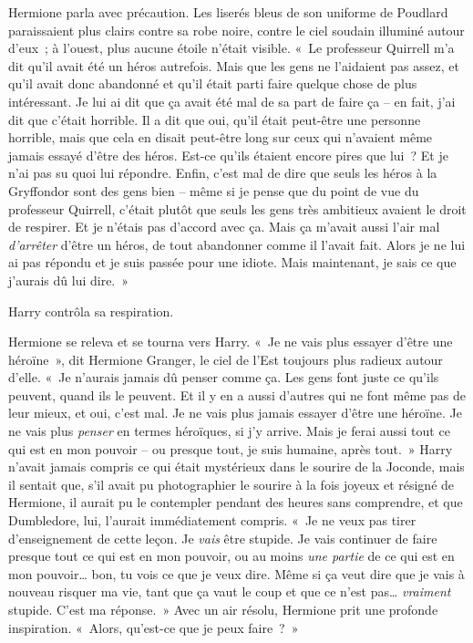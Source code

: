 Hermione parla avec précaution. Les liserés bleus de son uniforme de Poudlard paraissaient plus clairs contre sa robe noire, contre le ciel soudain illuminé autour d'eux~; à l'ouest, plus aucune étoile n'était visible. «~Le professeur Quirrell m'a dit qu'il avait été un héros autrefois. Mais que les gens ne l'aidaient pas assez, et qu'il avait donc abandonné et qu'il était parti faire quelque chose de plus intéressant. Je lui ai dit que ça avait été mal de sa part de faire ça -- en fait, j'ai dit que c'était horrible. Il a dit que oui, qu'il était peut-être une personne horrible, mais que cela en disait peut-être long sur ceux qui n'avaient même jamais essayé d'être des héros. Est-ce qu'ils étaient encore pires que lui~? Et je n'ai pas su quoi lui répondre. Enfin, c'est mal de dire que seuls les héros à la Gryffondor sont des gens bien -- même si je pense que du point de vue du professeur Quirrell, c'était plutôt que seuls les gens très ambitieux avaient le droit de respirer. Et je n'étais pas d'accord avec ça. Mais ça m'avait aussi l'air mal \emph{d'arrêter} d'être un héros, de tout abandonner comme il l'avait fait. Alors je ne lui ai pas répondu et je suis passée pour une idiote. Mais maintenant, je sais ce que j'aurais dû lui dire.~»

Harry contrôla sa respiration.

Hermione se releva et se tourna vers Harry. «~Je ne vais plus essayer d'être une héroïne~», dit Hermione Granger, le ciel de l'Est toujours plus radieux autour d'elle. «~Je n'aurais jamais dû penser comme ça. Les gens font juste ce qu'ils peuvent, quand ils le peuvent. Et il y en a aussi d'autres qui ne font même pas de leur mieux, et oui, c'est mal. Je ne vais plus jamais essayer d'être une héroïne. Je ne vais plus \emph{penser} en termes héroïques, si j'y arrive. Mais je ferai aussi tout ce qui est en mon pouvoir -- ou presque tout, je suis humaine, après tout.~» Harry n'avait jamais compris ce qui était mystérieux dans le sourire de la Joconde, mais il sentait que, s'il avait pu photographier le sourire à la fois joyeux et résigné de Hermione, il aurait pu le contempler pendant des heures sans comprendre, et que Dumbledore, lui, l'aurait immédiatement compris. «~Je ne veux pas tirer d'enseignement de cette leçon. Je \emph{vais} être stupide. Je vais continuer de faire presque tout ce qui est en mon pouvoir, ou au moins \emph{une partie} de ce qui est en mon pouvoir… bon, tu vois ce que je veux dire. Même si ça veut dire que je vais à nouveau risquer ma vie, tant que ça vaut le coup et que ce n'est pas… \emph{vraiment} stupide. C'est ma réponse.~» Avec un air résolu, Hermione prit une profonde inspiration. «~Alors, qu'est-ce que je peux faire~?~»

